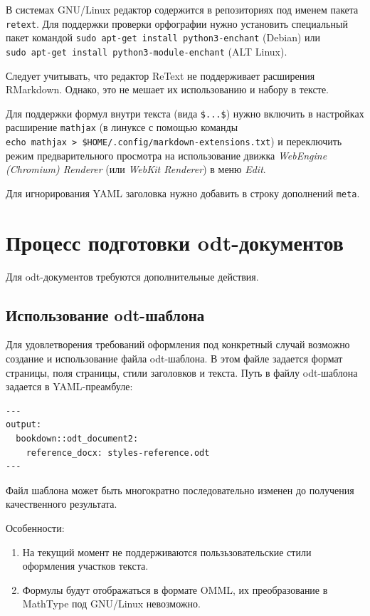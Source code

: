 \documentclass[
  a4paper,
]{book}
\providecommand{\tightlist}{%
  \setlength{\itemsep}{0pt}\setlength{\parskip}{0pt}}
\theoremstyle{definition}
\theoremstyle{definition}
\theoremstyle{definition}
\theoremstyle{definition}
\theoremstyle{remark}
\begin{document}
В системах GNU/Linux редактор содержится в репозиториях под именем пакета \texttt{retext}. Для поддержки проверки орфографии нужно установить специальный пакет командой \texttt{sudo\ apt-get\ install\ python3-enchant} (Debian) или \texttt{sudo\ apt-get\ install\ python3-module-enchant} (ALT Linux).

Следует учитывать, что редактор ReText не поддерживает расширения RMarkdown. Однако, это не мешает их использованию и набору в тексте.

Для поддержки формул внутри текста (вида \texttt{\$...\$}) нужно включить в настройках расширение \texttt{mathjax} (в линуксе с помощью команды \texttt{echo\ mathjax\ \textgreater{}\ \$HOME/.config/markdown-extensions.txt}) и переключить режим предварительного просмотра на использование движка \emph{WebEngine (Chromium) Renderer} (или \emph{WebKit Renderer}) в меню \emph{Edit}.

Для игнорирования YAML заголовка нужно добавить в строку дополнений \texttt{meta}.

\section{Процесс подготовки odt-документов}\label{authoring-odt}

Для odt-документов требуются дополнительные действия.

\subsection{Использование odt-шаблона}\label{authoring-odt-template}

Для удовлетворения требований оформления под конкретный случай возможно создание и использование файла odt-шаблона. В этом файле задается формат страницы, поля страницы, стили заголовков и текста. Путь в файлу odt-шаблона задается в YAML-преамбуле:

\begin{verbatim}
---
output:
  bookdown::odt_document2:
    reference_docx: styles-reference.odt
---
\end{verbatim}

Файл шаблона может быть многократно последовательно изменен до получения качественного результата.

Особенности:

\begin{enumerate}
\def\labelenumi{\arabic{enumi}.}
\tightlist
\item
  На текущий момент не поддерживаются пользьзовательские стили оформления участков текста.
\item
  Формулы будут отображаться в формате OMML, их преобразование в MathType под GNU/Linux невозможно.
\end{enumerate}
\end{document}
